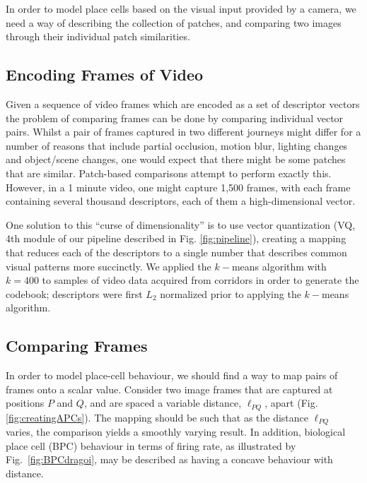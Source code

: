 In order to model place cells based on the visual input provided by a camera, we need a way of describing the collection of patches, and comparing two images through their individual patch similarities. 



\subsection{Encoding Frames of Video}
Given a sequence of video frames which are encoded as a set of descriptor vectors the problem of comparing frames can be done by comparing individual vector pairs.  Whilst a pair of frames captured in two different journeys might differ for a number of reasons that include partial occlusion, motion blur, lighting changes and object/scene changes, one would expect that there might be some patches that are similar.  Patch-based comparisons attempt to perform exactly this.  However, in a 1 minute video, one might capture 1,500 frames, with each frame containing several thousand descriptors, each of them a high-dimensional vector.

One solution to this ``curse of dimensionality'' is to use vector quantization (VQ, 4th module of our pipeline described in Fig. \ref{fig:pipeline}), creating a mapping that reduces each of the descriptors to a single number that describes common visual patterns more succinctly.  We applied the $k-$means algorithm with $k = 400$ to samples of video data acquired from corridors in order to generate the codebook; descriptors were first $L_2$ normalized prior to applying the $k-$means algorithm. 


\subsection{Comparing Frames}
In order to model place-cell behaviour, we should find a way to map pairs of frames onto a scalar value. Consider two image frames that are captured at positions $P$ and $Q$, and are spaced a variable distance, $\ell_{PQ}$, apart (Fig. \ref{fig:creatingAPCs}). The mapping should be such that as the distance $\ell_{PQ}$ varies, the comparison yields a smoothly varying result. In addition, biological place cell (BPC) behaviour in terms of firing rate, as illustrated by Fig.~\ref{fig:BPCdragoi}, may be described as having a concave behaviour with distance. %

